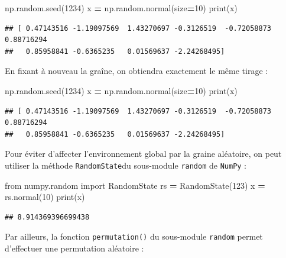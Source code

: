 \documentclass[
  12pt,
]{book}
\newenvironment{Shaded}{\begin{snugshade}}{\end{snugshade}}
\newcommand{\BuiltInTok}[1]{#1}
\newcommand{\DecValTok}[1]{\textcolor[rgb]{0.00,0.00,0.81}{#1}}
\newcommand{\ImportTok}[1]{#1}
\newcommand{\NormalTok}[1]{#1}
\newcommand{\OperatorTok}[1]{\textcolor[rgb]{0.81,0.36,0.00}{\textbf{#1}}}
\numberwithin{equation}{section}
\numberwithin{countremarque}{section}
\begin{document}
\begin{Shaded}
\begin{Highlighting}[]
\NormalTok{np.random.seed(}\DecValTok{1234}\NormalTok{)}
\NormalTok{x }\OperatorTok{=}\NormalTok{ np.random.normal(size}\OperatorTok{=}\DecValTok{10}\NormalTok{)}
\BuiltInTok{print}\NormalTok{(x)}
\end{Highlighting}
\end{Shaded}

\begin{lstlisting}
## [ 0.47143516 -1.19097569  1.43270697 -0.3126519  -0.72058873  0.88716294
##   0.85958841 -0.6365235   0.01569637 -2.24268495]
\end{lstlisting}

En fixant à nouveau la graîne, on obtiendra exactement le même tirage :

\begin{Shaded}
\begin{Highlighting}[]
\NormalTok{np.random.seed(}\DecValTok{1234}\NormalTok{)}
\NormalTok{x }\OperatorTok{=}\NormalTok{ np.random.normal(size}\OperatorTok{=}\DecValTok{10}\NormalTok{)}
\BuiltInTok{print}\NormalTok{(x)}
\end{Highlighting}
\end{Shaded}

\begin{lstlisting}
## [ 0.47143516 -1.19097569  1.43270697 -0.3126519  -0.72058873  0.88716294
##   0.85958841 -0.6365235   0.01569637 -2.24268495]
\end{lstlisting}

Pour éviter d'affecter l'environnement global par la graine aléatoire, on peut utiliser la méthode \texttt{RandomState}du sous-module \texttt{random} de \texttt{NumPy} :

\begin{Shaded}
\begin{Highlighting}[]
\ImportTok{from}\NormalTok{ numpy.random }\ImportTok{import}\NormalTok{ RandomState}
\NormalTok{rs }\OperatorTok{=}\NormalTok{ RandomState(}\DecValTok{123}\NormalTok{)}
\NormalTok{x }\OperatorTok{=}\NormalTok{ rs.normal(}\DecValTok{10}\NormalTok{)}
\BuiltInTok{print}\NormalTok{(x)}
\end{Highlighting}
\end{Shaded}

\begin{lstlisting}
## 8.914369396699438
\end{lstlisting}

Par ailleurs, la fonction \texttt{permutation()} du sous-module \texttt{random} permet d'effectuer une permutation aléatoire :
\end{document}
